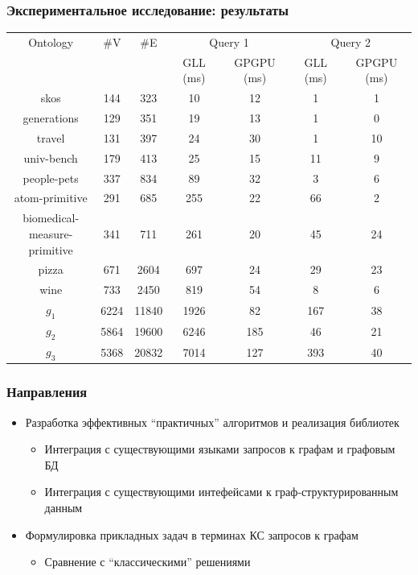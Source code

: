 \documentclass[xcolor=table,aspectratio=169]{beamer}
\begin{document}
\begin{frame}[fragile]
\transwipe[direction=90]
\frametitle{Экспериментальное исследование: результаты}
\centering
{}
\begin{tabular}{  c | c | c | c | c | c | c }
Ontology & \#V & \#E & \multicolumn{2}{c|}{Query 1} & \multicolumn{2}{c}{Query 2} \\
\cline{4-7}
& & & GLL (ms) & GPGPU (ms)  & GLL (ms) & GPGPU (ms) \\
\hline 
\hline
skos        & 144  & 323    & 10   & 12  & 1   & 1 \\
generations & 129  & 351    & 19   & 13  & 1   & 0 \\
travel      & 131  & 397    & 24   & 30  & 1   & 10 \\
univ-bench  & 179  & 413    & 25   & 15  & 11  & 9 \\
people-pets & 337  & 834    & 89   & 32  & 3   & 6 \\
atom-primitive 
            & 291  & 685    & 255  & 22  & 66  & 2 \\
\shortstack{biomedical- \\ measure-primitive} 
            & 341  & 711    & 261  & 20  & 45  & 24 \\
pizza       & 671  & 2604   & 697  & 24  & 29  & 23 \\
wine        & 733  & 2450   & 819  & 54  & 8   & 6 \\
$g_{1}$     & 6224 & 11840  & 1926 & 82  & 167 & 38\\
$g_{2}$     & 5864 & 19600  & 6246 & 185 & 46  & 21\\
$g_{3}$     & 5368 & 20832  & 7014 & 127 & 393 & 40\\

\end{tabular}

\end{frame}

\begin{frame}
  \transwipe[direction=90]
  \frametitle{Направления}

\begin{itemize} 
\item Разработка эффективных ``практичных'' алгоритмов и реализация библиотек
\begin{itemize} 
\item Интеграция с существующими языками запросов к графам и графовым БД    
\item Интеграция с существующими интефейсами к граф-структурированным данным
\end{itemize}

\item Формулировка прикладных задач в терминах КС запросов к графам
\begin{itemize} 
\item Сравнение с ``классическими'' решениями
\end{itemize}

\end{itemize}

\end{frame}
\end{document}
